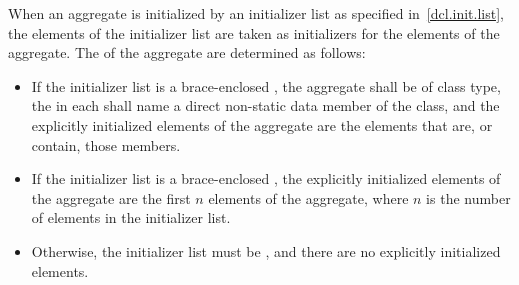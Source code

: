 \pnum
When an aggregate is initialized by an initializer list
as specified in~\ref{dcl.init.list},
the elements of the initializer list are taken as initializers
for the elements of the aggregate.
The 
of the aggregate are determined as follows:
\begin{itemize}
\item
If the initializer list is
a brace-enclosed ,
the aggregate shall be of class type,
the  in each 
shall name a direct non-static data member of the class, and
the explicitly initialized elements of the aggregate
are the elements that are, or contain, those members.
\item
If the initializer list is a brace-enclosed ,
the explicitly initialized elements of the aggregate
are the first $n$ elements of the aggregate,
where $n$ is the number of elements in the initializer list.
\item
Otherwise, the initializer list must be \tcode{\{\}},
and there are no explicitly initialized elements.
\end{itemize}

